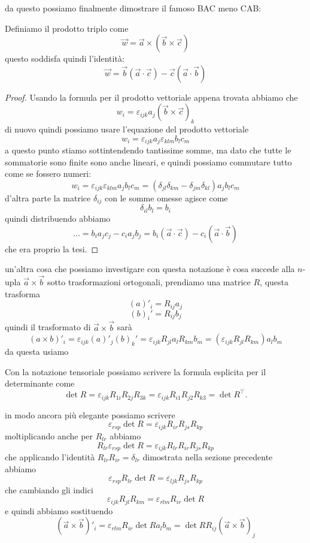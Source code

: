 \documentclass[11pt]{scrartcl}
\begin{document}
	da questo possiamo finalmente dimostrare il famoso BAC meno CAB:
	\begin{theorem}
		Definiamo il prodotto triplo come
		$$\vec{w}=\vec{a}\times (\vec{b}\times \vec{c})$$
		questo soddisfa quindi l'identità:
		$$\vec{w}=\vec{b}(\vec{a}\cdot \vec{c})-\vec{c}(\vec{a}\cdot \vec{b})$$
	\end{theorem}
	\begin{proof}
		Usando la formula per il prodotto vettoriale appena trovata abbiamo che
		$$w_i=\varepsilon_{ijk}a_j(\vec{b}\times \vec{c})_k$$
		di nuovo quindi possiamo usare l'equazione del prodotto vettoriale
		$$w_i=\varepsilon_{ijk}a_j\varepsilon_{klm}b_lc_m$$
		a questo punto stiamo sottintendendo tantissime somme, ma dato che tutte le sommatorie sono finite sono anche lineari, e quindi possiamo commutare tutto come se fossero numeri:
		$$w_i=\varepsilon_{ijk}\varepsilon_{klm}a_jb_lc_m=(\delta_{jl}\delta_{km}-\delta_{jm}\delta_{kl})a_jb_lc_m$$
		d'altra parte la matrice $\delta_{ij}$ con le somme omesse agisce come
		$$\delta_{il}b_l=b_i$$
		quindi distribuendo abbiamo
		$$\dots = b_ia_jc_j-c_ia_jb_j=b_i(\vec{a}\cdot \vec{c})-c_i(\vec{a}\cdot \vec{b})$$
		che era proprio la tesi.
	\end{proof}
	un'altra cosa che possiamo investigare con questa notazione è cosa succede alla $n$-upla $\vec{a}\times \vec{b}$ sotto trasformazioni ortogonali, prendiamo una matrice $R$, questa trasforma
	$$(a)'_i=R_{ij}a_j$$
	$$(b)_i'=R_{ij}b_j$$
	quindi il trasformato di $\vec{a}\times \vec{b}$ sarà
	$$(a\times b)'_i=\varepsilon_{ijk}(a)'_j(b)_k'=\varepsilon_{ijk}R_{jl}a_lR_{km}b_m=(\varepsilon_{ijk}R_{jl}R_{km})a_lb_m$$
	da questa usiamo
	\begin{theorem}
		Con la notazione tensoriale possiamo scrivere la formula esplicita per il determinante come
		$$\det R = \varepsilon_{ijk}R_{1i}R_{2j}R_{3k}=\varepsilon_{ijk}R_{i1}R_{j2}R_{k3}=\det R^\intercal.$$
	\end{theorem} 
	in modo ancora più elegante possiamo scrivere
	$$\varepsilon_{rsp}\det R= \varepsilon_{ijk}R_{ir}R_{js}R_{kp}$$
	moltiplicando anche per $R_{lr}$ abbiamo
	$$R_{lr}\varepsilon_{rsp}\det R=\varepsilon_{ijk}R_{lr}R_{ir}R_{js}R_{kp}$$
	che applicando l'identità $R_{lr}R_{ir}=\delta_{lr}$ dimostrata nella sezione precedente abbiamo 
	$$\varepsilon_{rsp}R_{lr}\det R=\varepsilon_{ljk}R_{js}R_{kp}$$
	che cambiando gli indici
	$$\varepsilon_{ijk}R_{jl}R_{km}=\varepsilon_{rlm}R_{ir}\det R$$
	e quindi abbiamo sostituendo
	$$(\vec{a}\times \vec{b})'_i=\varepsilon_{rlm}R_{ir}\det R a_l b_m=\det R R_{ij}(\vec{a}\times \vec{b})_j$$
	
\end{document}
